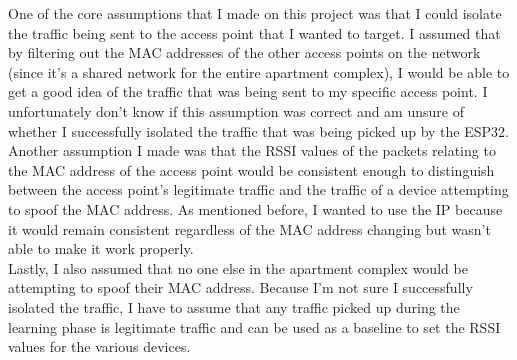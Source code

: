 \documentclass[letterpaper, 11pt]{article}
\begin{document}
One of the core assumptions that I made on this project was that I could isolate the traffic being sent to the access point that I wanted to target. I assumed that by filtering out the MAC addresses
of the other access points on the network (since it's a shared network for the entire apartment complex), I would be able to get a good idea of the traffic that was being sent to my specific access point.
I unfortunately don't know if this assumption was correct and am unsure of whether I successfully isolated the traffic that was being picked up by the ESP32.
\\\indent Another assumption I made was that the RSSI values of the packets relating to the MAC address of the access point would be consistent enough to distinguish between the 
access point's legitimate traffic and the traffic of a device attempting to spoof the MAC address. As mentioned before, I wanted to use the IP because it would remain consistent regardless of the 
MAC address changing but wasn't able to make it work properly. 
\\\indent Lastly, I also assumed that no one else in the apartment complex would be attempting to spoof their MAC address. Because I'm not sure I successfully isolated the traffic, I have to assume 
that any traffic picked up during the learning phase is legitimate traffic and can be used as a baseline to set the RSSI values for the various devices.
\end{document}
